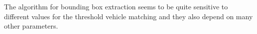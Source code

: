 \documentclass[a4paper, 11pt, DIV=14]{scrartcl}
\begin{document}
The algorithm for bounding box extraction seems to be quite sensitive to different values for the threshold vehicle matching and they also depend on many other parameters.
%
%
%
%
%
%
%
%
\end{document}
